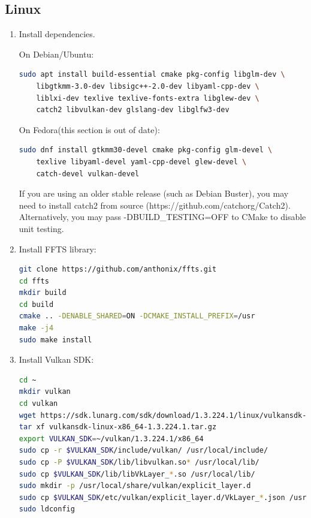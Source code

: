 \subsection{Linux}
\begin{enumerate}

\item Install dependencies.

On Debian/Ubuntu:

\begin{lstlisting}[language=sh, numbers=none]
sudo apt install build-essential cmake pkg-config libglm-dev \
	libgtkmm-3.0-dev libsigc++-2.0-dev libyaml-cpp-dev \
	liblxi-dev texlive texlive-fonts-extra libglew-dev \
	catch2 libvulkan-dev glslang-dev libglfw3-dev
\end{lstlisting}

On Fedora(this section is out of date):

\begin{lstlisting}[language=sh, numbers=none]
sudo dnf install gtkmm30-devel cmake pkg-config glm-devel \
	texlive libyaml-devel yaml-cpp-devel glew-devel \
	catch-devel vulkan-devel
\end{lstlisting}

If you are using an older stable release (such as Debian Buster), you may need to install catch2 from source
(https://github.com/catchorg/Catch2). Alternatively, you may pass -DBUILD\_TESTING=OFF to CMake to disable unit testing.

\item Install FFTS library:

\begin{lstlisting}[language=sh, numbers=none]
git clone https://github.com/anthonix/ffts.git
cd ffts
mkdir build
cd build
cmake .. -DENABLE_SHARED=ON -DCMAKE_INSTALL_PREFIX=/usr
make -j4
sudo make install
\end{lstlisting}


\item Install Vulkan SDK:

\begin{lstlisting}[language=sh, numbers=none]
cd ~
mkdir vulkan
cd vulkan
wget https://sdk.lunarg.com/sdk/download/1.3.224.1/linux/vulkansdk-linux-x86_64-1.3.224.1.tar.gz
tar xf vulkansdk-linux-x86_64-1.3.224.1.tar.gz
export VULKAN_SDK=~/vulkan/1.3.224.1/x86_64
sudo cp -r $VULKAN_SDK/include/vulkan/ /usr/local/include/
sudo cp -P $VULKAN_SDK/lib/libvulkan.so* /usr/local/lib/
sudo cp $VULKAN_SDK/lib/libVkLayer_*.so /usr/local/lib/
sudo mkdir -p /usr/local/share/vulkan/explicit_layer.d
sudo cp $VULKAN_SDK/etc/vulkan/explicit_layer.d/VkLayer_*.json /usr/local/share/vulkan/explicit_layer.d
sudo ldconfig
\end{lstlisting}


\end{enumerate}
